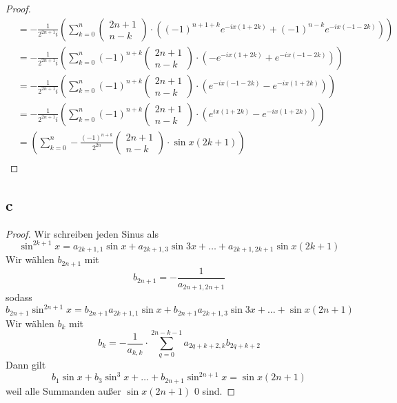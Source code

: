 \documentclass[a4paper,10pt]{article}
\begin{document}
\begin{proof}
\begin{align*}
  & = -\frac{1}{2^{2n + 1}i} \left(\sum_{k = 0}^{n} \begin{pmatrix}2n + 1\\n - k\end{pmatrix} \cdot \left( (-1)^{n + 1 + k}e^{-ix(1 + 2k)} + (-1)^{n - k}e^{-ix(-1 - 2k)} \right)\right)\\
  & = -\frac{1}{2^{2n + 1}i} \left(\sum_{k = 0}^{n} (-1)^{n + k} \begin{pmatrix}2n + 1\\n - k\end{pmatrix} \cdot \left( -e^{-ix(1 + 2k)} + e^{-ix(-1 - 2k)} \right)\right)\\
  & = -\frac{1}{2^{2n + 1}i} \left(\sum_{k = 0}^{n} (-1)^{n + k} \begin{pmatrix}2n + 1\\n - k\end{pmatrix} \cdot \left( e^{-ix(-1 - 2k)} - e^{-ix(1 + 2k)} \right)\right)\\
  & = -\frac{1}{2^{2n + 1}i} \left(\sum_{k = 0}^{n} (-1)^{n + k} \begin{pmatrix}2n + 1\\n - k\end{pmatrix} \cdot \left( e^{ix(1 + 2k)} - e^{-ix(1 + 2k)} \right)\right)\\
  & = \left(\sum_{k = 0}^{n} -\frac{(-1)^{n + k}}{2^{2n}} \begin{pmatrix}2n + 1\\n - k\end{pmatrix} \cdot \sin x(2k + 1) \right)\\
 \end{align*}
\end{proof}

\subsection*{c}

\begin{proof}
 Wir schreiben jeden Sinus als
 \begin{equation}
  \sin^{2k + 1} x = a_{2k + 1, 1} \sin x + a_{2k + 1, 3} \sin 3x + \dots + a_{2k + 1, 2k + 1} \sin x(2k + 1)
 \end{equation}
 Wir wählen $b_{2n + 1}$ mit
 \begin{equation}
  b_{2n + 1} = -\frac{1}{a_{2n + 1, 2n + 1}}
 \end{equation}
 sodass
 \begin{equation}
  b_{2n + 1}\sin^{2n + 1} x = b_{2n + 1}a_{2k + 1, 1} \sin x + b_{2n + 1}a_{2k + 1, 3} \sin 3x + \dots + \sin x(2n + 1)
 \end{equation}
 Wir wählen $b_k$ mit
 \begin{equation}
  b_k = -\frac{1}{a_{k,k}} \cdot \sum_{q = 0}^{2n - k - 1} a_{2q + k + 2, k}b_{2q + k + 2}
 \end{equation}
 Dann gilt
 \begin{equation}
  b_1 \sin x + b_3 \sin^3 x + \dots + b_{2n + 1} \sin^{2n + 1} x = \sin x(2n + 1)
 \end{equation}
 weil alle Summanden außer $\sin x(2n + 1)$ $0$ sind.
\end{proof}
\end{document}
